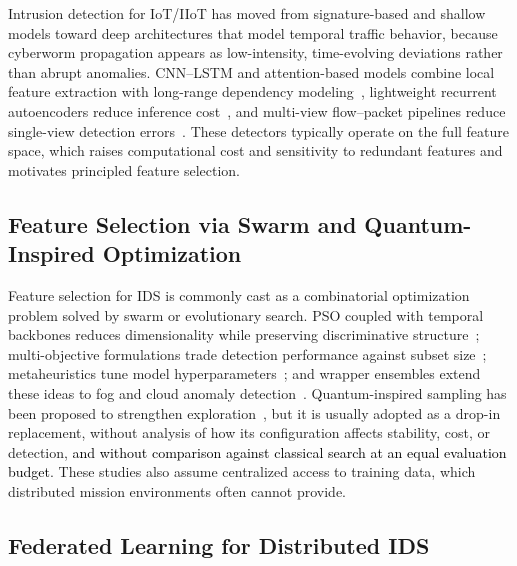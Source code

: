 \documentclass[conference]{IEEEtran}
\begin{document}
Intrusion detection for IoT/IIoT has moved from signature-based and
shallow models toward deep architectures that model temporal traffic
behavior, because cyberworm propagation appears as low-intensity,
time-evolving deviations rather than abrupt anomalies. CNN--LSTM and
attention-based models combine local feature extraction with
long-range dependency modeling~\cite{phalaagaehybrid,yuadaptive},
lightweight recurrent autoencoders reduce inference
cost~\cite{yupgtad}, and multi-view flow--packet pipelines reduce
single-view detection errors~\cite{sudyanaflow}. These detectors
typically operate on the full feature space, which raises
computational cost and sensitivity to redundant features and
motivates principled feature selection.

\subsection{Feature Selection via Swarm and Quantum-Inspired Optimization}

Feature selection for IDS is commonly cast as a combinatorial
optimization problem solved by swarm or evolutionary search.
PSO coupled with temporal backbones reduces dimensionality while
preserving discriminative structure~\cite{donkoloptimization};
multi-objective formulations trade detection performance against
subset size~\cite{sezginmulti,raeisientropy}; metaheuristics tune
model hyperparameters~\cite{kishoreimproved}; and wrapper ensembles
extend these ideas to fog and cloud anomaly
detection~\cite{yaseenefficient,bilalevaluation,maryenhancing,shrivashybrid}.
Quantum-inspired sampling has been proposed to strengthen
exploration~\cite{vivekquantum}, but it is usually adopted as a
drop-in replacement, without analysis of how its configuration affects
stability, cost, or detection, \textcolor{black}{and without
comparison against classical search at an equal evaluation budget}.
These studies also assume centralized access to training data, which
distributed mission environments often cannot provide.

\subsection{Federated Learning for Distributed IDS}
\end{document}
